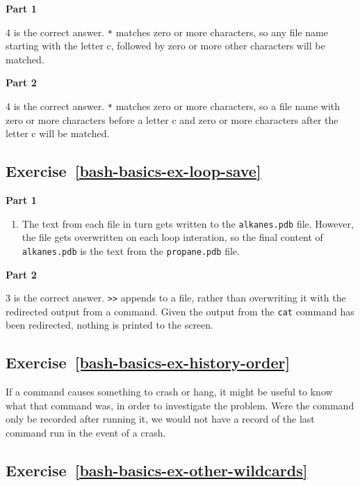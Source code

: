 \documentclass[
]{krantz}
\providecommand{\tightlist}{%
  \setlength{\itemsep}{0pt}\setlength{\parskip}{0pt}}
\begin{document}
\textbf{Part 1}

4 is the correct answer. \texttt{*} matches zero or more characters, so any file name starting with
the letter c, followed by zero or more other characters will be matched.

\textbf{Part 2}

4 is the correct answer. \texttt{*} matches zero or more characters, so a file name with zero or more
characters before a letter c and zero or more characters after the letter c will be matched.

\hypertarget{exercise-refbash-basics-ex-loop-save}{%
\subsection*{Exercise~\ref{bash-basics-ex-loop-save}}\label{exercise-refbash-basics-ex-loop-save}}


\textbf{Part 1}

\begin{enumerate}
\def\labelenumi{\arabic{enumi}.}
\tightlist
\item
  The text from each file in turn gets written to the \texttt{alkanes.pdb} file.
  However, the file gets overwritten on each loop interation, so the final content of \texttt{alkanes.pdb}
  is the text from the \texttt{propane.pdb} file.
\end{enumerate}

\textbf{Part 2}

3 is the correct answer. \texttt{\textgreater{}\textgreater{}} appends to a file, rather than overwriting it with the redirected
output from a command.
Given the output from the \texttt{cat} command has been redirected, nothing is printed to the screen.

\hypertarget{exercise-refbash-basics-ex-history-order}{%
\subsection*{Exercise~\ref{bash-basics-ex-history-order}}\label{exercise-refbash-basics-ex-history-order}}


If a command causes something to crash or hang, it might be useful
to know what that command was, in order to investigate the problem.
Were the command only be recorded after running it, we would not
have a record of the last command run in the event of a crash.

\hypertarget{exercise-refbash-basics-ex-other-wildcards}{%
\subsection*{Exercise~\ref{bash-basics-ex-other-wildcards}}\label{exercise-refbash-basics-ex-other-wildcards}}
\end{document}

